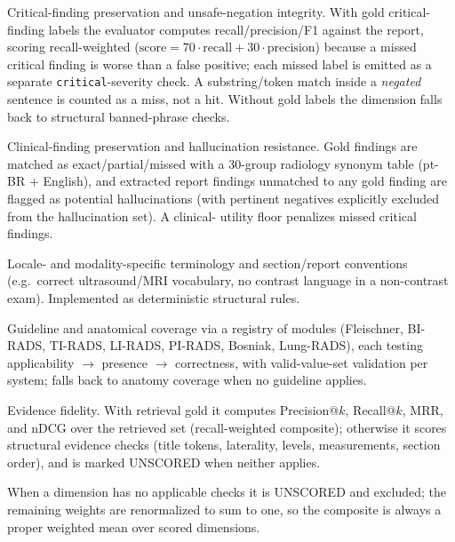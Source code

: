 \documentclass[11pt]{article}
\newcommand{\dimname}[1]{\textsc{#1}}
\begin{document}
\begin{description}[leftmargin=1.2cm,style=nextline]
\item[\dimname{CRIT} (0.30)] Critical-finding preservation and unsafe-negation
integrity. With gold critical-finding labels the evaluator computes
recall/precision/F1 against the report, scoring recall-weighted
($\text{score}=70\cdot\text{recall}+30\cdot\text{precision}$) because a missed
critical finding is worse than a false positive; each missed label is emitted as
a separate \texttt{critical}-severity check. A substring/token match inside a
\emph{negated} sentence is counted as a miss, not a hit. Without gold labels the
dimension falls back to structural banned-phrase checks.
\item[\dimname{QUAL} (0.25)] Clinical-finding preservation and hallucination
resistance. Gold findings are matched as exact/partial/missed with a
30-group radiology synonym table (pt-BR + English), and extracted report findings
unmatched to any gold finding are flagged as potential hallucinations (with
pertinent negatives explicitly excluded from the hallucination set). A clinical-
utility floor penalizes missed critical findings.
\item[\dimname{TERM} (0.20)] Locale- and modality-specific terminology and
section/report conventions (e.g.\ correct ultrasound/MRI vocabulary, no
contrast language in a non-contrast exam). Implemented as deterministic
structural rules.
\item[\dimname{GUIDE} (0.15)] Guideline and anatomical coverage via a registry of
modules (Fleischner, BI-RADS, TI-RADS, LI-RADS, PI-RADS, Bosniak, Lung-RADS),
each testing applicability $\rightarrow$ presence $\rightarrow$ correctness, with
valid-value-set validation per system; falls back to anatomy coverage when no
guideline applies.
\item[\dimname{RAG} (0.10)] Evidence fidelity. With retrieval gold it computes
Precision@$k$, Recall@$k$, MRR, and nDCG \cite{JarvelinKekalainen2002} over the
retrieved set (recall-weighted composite); otherwise it scores structural
evidence checks (title tokens, laterality, levels, measurements, section order),
and is marked \dimname{UNSCORED} when neither applies.
\end{description}

When a dimension has no applicable checks it is \dimname{UNSCORED} and excluded;
the remaining weights are renormalized to sum to one, so the composite is always
a proper weighted mean over scored dimensions.
\end{document}
